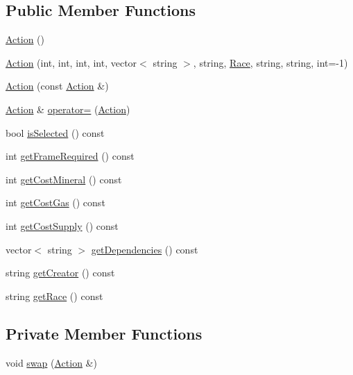 \subsection*{Public Member Functions}
\begin{DoxyCompactItemize}
\item 
\hyperlink{classghost_1_1Action_a82c7d6aec3d39fd036395fcf563fd2c5}{Action} ()
\item 
\hyperlink{classghost_1_1Action_a1b46308adb26e8f70b28f2751deadc8e}{Action} (int, int, int, int, vector$<$ string $>$, string, \hyperlink{namespaceghost_a8b1db75c40c6980adcf244ddccc0324b}{Race}, string, string, int=-\/1)
\item 
\hyperlink{classghost_1_1Action_af83e86975dc608cb9ebe7447fa2b368a}{Action} (const \hyperlink{classghost_1_1Action}{Action} \&)
\item 
\hyperlink{classghost_1_1Action}{Action} \& \hyperlink{classghost_1_1Action_a56179a064666c0b895daa0006ebe26d1}{operator=} (\hyperlink{classghost_1_1Action}{Action})
\item 
bool \hyperlink{classghost_1_1Action_a3a9c93b2d9ba2181e74fddceaec84a34}{is\-Selected} () const 
\item 
int \hyperlink{classghost_1_1Action_a4f0d5d2692392c695342c3a6ae3bb516}{get\-Frame\-Required} () const 
\item 
int \hyperlink{classghost_1_1Action_ad8f83b004d632ef058e2aced097af7f0}{get\-Cost\-Mineral} () const 
\item 
int \hyperlink{classghost_1_1Action_a46881c65b49922ee92afa96ac2c38d17}{get\-Cost\-Gas} () const 
\item 
int \hyperlink{classghost_1_1Action_ae1f8a3db9caafbcaa2039600f11eafd7}{get\-Cost\-Supply} () const 
\item 
vector$<$ string $>$ \hyperlink{classghost_1_1Action_a8396f1b683a8d6a20c5007aab5e1c02b}{get\-Dependencies} () const 
\item 
string \hyperlink{classghost_1_1Action_a7e9e96cdfbc4ed561d782d2af51fb1ab}{get\-Creator} () const 
\item 
string \hyperlink{classghost_1_1Action_ae122e7bef9ca4e416bdb881b33b5dbbb}{get\-Race} () const 
\end{DoxyCompactItemize}
\subsection*{Private Member Functions}
\begin{DoxyCompactItemize}
\item 
void \hyperlink{classghost_1_1Action_a8c965c1de8861fd2fd49cec707d94be0}{swap} (\hyperlink{classghost_1_1Action}{Action} \&)
\end{DoxyCompactItemize}
